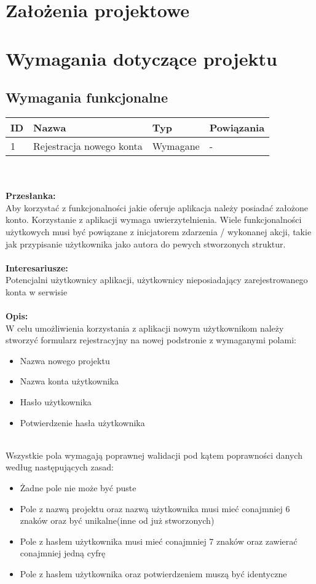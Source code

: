 \documentclass[eng,printmode]{mgr}
\begin{document}
\chapter{Założenia projektowe}
\chapter{Wymagania dotyczące projektu}
\section{Wymagania funkcjonalne}
\begin{tabularx}{\textwidth}{ l | X | l | l }
\textbf {ID} & \textbf{Nazwa} & \textbf{Typ} & \textbf{Powiązania} \\
\hline
1 
& Rejestracja nowego konta
& Wymagane
& -
\end{tabularx}
\\ \\
\textbf{Przesłanka:} \\
Aby korzystać z funkcjonalności jakie oferuje aplikacja należy posiadać założone konto. Korzystanie z aplikacji wymaga uwierzytelnienia. Wiele funkcjonalności użytkowych musi być powiązane z inicjatorem zdarzenia / wykonanej akcji, takie jak przypisanie użytkownika jako autora do pewych stworzonych struktur.
\\ \\
\textbf{Interesariusze:} \\
Potencjalni użytkownicy aplikacji, użytkownicy nieposiadający zarejestrowanego konta w serwisie
\\ \\
\textbf{Opis:} \\
W celu umożliwienia korzystania z aplikacji nowym użytkownikom należy stworzyć formularz rejestracyjny na nowej podstronie z wymaganymi polami:
\begin{itemize}
	\item Nazwa nowego projektu
	\item Nazwa konta użytkownika
	\item Hasło użytkownika
	\item Potwierdzenie hasła użytkownika
\end{itemize}
\ \\
Wszystkie pola wymagają poprawnej walidacji pod kątem poprawności danych według następujących zasad:
\begin{itemize}
	\item Żadne pole nie może być puste
	\item Pole z nazwą projektu oraz nazwą użytkownika musi mieć conajmniej 6 znaków oraz być unikalne(inne od już stworzonych)
	\item Pole z hasłem użytkownika musi mieć conajmniej 7 znaków oraz zawierać conajmniej jedną cyfrę
	\item Pole z hasłem użytkownika oraz potwierdzeniem muszą być identyczne
\end{itemize}
\end{document}
